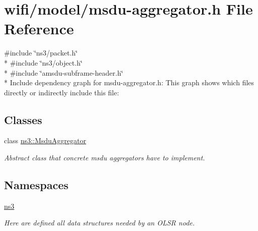 \hypertarget{msdu-aggregator_8h}{}\section{wifi/model/msdu-\/aggregator.h File Reference}
\label{msdu-aggregator_8h}
{\ttfamily \#include \char`\"{}ns3/packet.\+h\char`\"{}}\\*
{\ttfamily \#include \char`\"{}ns3/object.\+h\char`\"{}}\\*
{\ttfamily \#include \char`\"{}amsdu-\/subframe-\/header.\+h\char`\"{}}\\*
Include dependency graph for msdu-\/aggregator.h\+:
This graph shows which files directly or indirectly include this file\+:
\subsection*{Classes}
\begin{DoxyCompactItemize}
\item 
class \hyperlink{classns3_1_1MsduAggregator}{ns3\+::\+Msdu\+Aggregator}
\begin{DoxyCompactList}\small\item\em Abstract class that concrete msdu aggregators have to implement. \end{DoxyCompactList}\end{DoxyCompactItemize}
\subsection*{Namespaces}
\begin{DoxyCompactItemize}
\item 
 \hyperlink{namespacens3}{ns3}
\begin{DoxyCompactList}\small\item\em Here are defined all data structures needed by an O\+L\+SR node. \end{DoxyCompactList}\end{DoxyCompactItemize}
